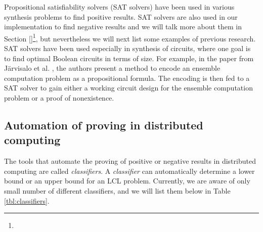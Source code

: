 Propositional satisfiability solvers (SAT solvers) have been used in various synthesis problems to find positive results.
SAT solvers are also used in our implementation to find negative results and we will talk more about them in Section \ref{}\footnote{}, but nevertheless we will next list some examples of previous research.
SAT solvers have been used especially in synthesis of circuits, where one goal is to find optimal Boolean circuits in terms of size.
For example, in the paper from Järvisalo et al. \cite{DBLP:conf/sat/JarvisaloKKK12}, the authors present a method to encode an ensemble computation problem as a propositional formula.
The encoding is then fed to a SAT solver to gain either a working circuit design for the ensemble computation problem or a proof of nonexistence.









%
%
%
\subsection{Automation of proving in distributed computing} \label{sec:prior_work:title_b}


The tools that automate the proving of positive or negative results in distributed computing are called \emph{classifiers}.
A \emph{classifier} can automatically determine a lower bound or an upper bound for an LCL problem.
Currently, we are aware of only small number of different classifiers, and we will list them below in Table \ref{tbl:classifiers}.



